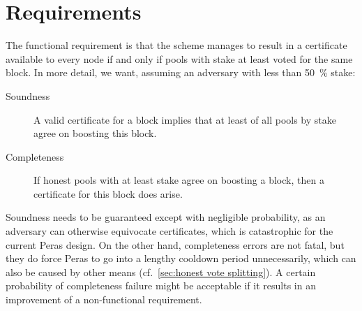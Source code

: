 \section{Requirements}\label{sec:cert reqs}

The functional requirement is that the scheme manages to result in a certificate available to every node if and only if pools with stake at least \perasQuorum{} voted for the same block.
In more detail, we want, assuming an adversary with less than \qty{50}{\percent} stake:
\begin{description}
\item[Soundness]
  A valid certificate for a block implies that at least \perasQuorum{} of all pools by stake agree on boosting this block.
\item[Completeness]
  If honest pools with at least \perasQuorum{} stake agree on boosting a block, then a certificate for this block does arise.
\end{description}
Soundness needs to be guaranteed except with negligible probability, as an adversary can otherwise equivocate certificates, which is catastrophic for the current Peras design.
On the other hand, completeness errors are not fatal, but they do force Peras to go into a lengthy cooldown period unnecessarily, which can also be caused by other means (cf.~\cref{sec:honest vote splitting}).
A certain probability of completeness failure might be acceptable if it results in an improvement of a non-functional requirement.

